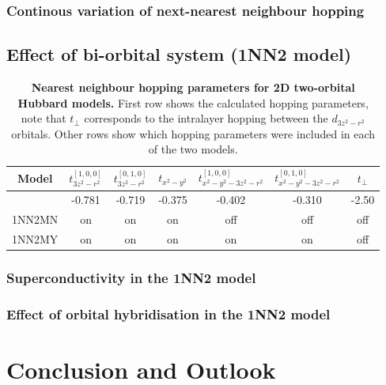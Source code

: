 \documentclass[12pt]{article}
\begin{document}
\subsubsection{Continous variation of next-nearest neighbour hopping}

\subsection{Effect of bi-orbital system (1NN2 model)}
\label{subsec:1NN2Model}

\begin{table}[h]
    \centering
    \begin{tabular}{|c|c|c|c|c|c|c|}
        \hline
       Model &$t^{[1,0,0]}_{3z^2-r^2}$  &$t^{[0,1,0]}_{3z^2-r^2}$  &  $t_{x^2 - y^2}$ &  $t^{[1,0,0]}_{x^2 - y^2 -3z^2-r^2} $ & $t^{[0,1,0]}_{x^2 - y^2 -3z^2-r^2} $ & $t_{\perp}$ \\
        \hline
        & -0.781 & -0.719  &  -0.375 & -0.402 & -0.310 & -2.50\\
        \hline
        1NN2MN & on &  on  & on  & off & off & off \\
        \hline
        1NN2MY & on &  on  & on  & on & on & off \\
          
        \hline
    \end{tabular}
    \caption{\textbf{Nearest neighbour hopping parameters for 2D  two-orbital Hubbard models.} First row shows the calculated hopping parameters, note that  $t_{\perp}$ corresponds to the intralayer hopping between the $d_{3z^2-r^2}$ orbitals. Other rows show which hopping parameters were included in each of the two models.}
    \label{tab:2D2orbparams }
\end{table}



\subsubsection{Superconductivity in the 1NN2 model}

\subsubsection{Effect of orbital hybridisation in the 1NN2 model}



\section{Conclusion and Outlook}


\newpage


\end{document}
